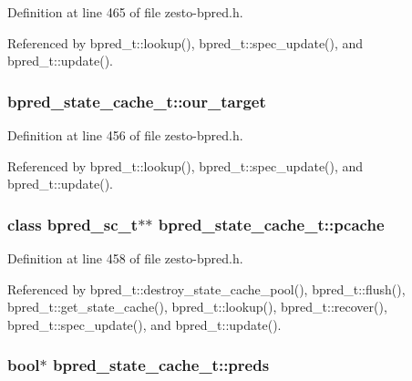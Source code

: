 Definition at line 465 of file zesto-bpred.h.

Referenced by bpred\_\-t::lookup(), bpred\_\-t::spec\_\-update(), and bpred\_\-t::update().
\subsubsection[{our\_\-target}]{ {\bf bpred\_\-state\_\-cache\_\-t::our\_\-target}\hspace{0.3cm}{\tt  [protected]}}\label{classbpred__state__cache__t_b86b749246b95fe7cedf505c4f69f3f8}




Definition at line 456 of file zesto-bpred.h.

Referenced by bpred\_\-t::lookup(), bpred\_\-t::spec\_\-update(), and bpred\_\-t::update().
\subsubsection[{pcache}]{\setlength{\rightskip}{0pt plus 5cm}class {\bf bpred\_\-sc\_\-t}$\ast$$\ast$ {\bf bpred\_\-state\_\-cache\_\-t::pcache}\hspace{0.3cm}{\tt  [protected]}}\label{classbpred__state__cache__t_0caa9290d262b185658b68ff0ad1a859}




Definition at line 458 of file zesto-bpred.h.

Referenced by bpred\_\-t::destroy\_\-state\_\-cache\_\-pool(), bpred\_\-t::flush(), bpred\_\-t::get\_\-state\_\-cache(), bpred\_\-t::lookup(), bpred\_\-t::recover(), bpred\_\-t::spec\_\-update(), and bpred\_\-t::update().
\subsubsection[{preds}]{\setlength{\rightskip}{0pt plus 5cm}bool$\ast$ {\bf bpred\_\-state\_\-cache\_\-t::preds}\hspace{0.3cm}{\tt  [protected]}}\label{classbpred__state__cache__t_dc9e375a218a14bee7c64c069a25fbf0}





